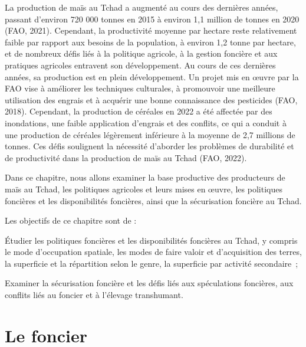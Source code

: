 \documentclass[12pt,oneside]{report}
\begin{document}
La production de maïs au Tchad a augmenté au cours des dernières années, passant d'environ 720 000 tonnes en 2015 à environ 1,1 million de tonnes en 2020 (FAO, 2021). Cependant, la productivité moyenne par hectare reste relativement faible par rapport aux besoins de la population, à environ 1,2 tonne par hectare, et de nombreux défis liés à la politique agricole, à la gestion foncière et aux pratiques agricoles entravent son développement. Au cours de ces dernières années, sa production est en plein développement. Un projet mis en œuvre par la FAO vise à améliorer les techniques culturales, à promouvoir une meilleure utilisation des engrais et à acquérir une bonne connaissance des pesticides ​(FAO, 2018)​. Cependant, la production de céréales en 2022 a été affectée par des inondations, une faible application d'engrais et des conflits, ce qui a conduit à une production de céréales légèrement inférieure à la moyenne de 2,7 millions de tonnes. Ces défis soulignent la nécessité d'aborder les problèmes de durabilité et de productivité dans la production de maïs au Tchad​ (FAO, 2022)​.

Dans ce chapitre, nous allons examiner la base productive des producteurs de maïs au Tchad, les politiques agricoles et leurs mises en œuvre, les politiques foncières et les disponibilités foncières, ainsi que la sécurisation foncière au Tchad.

Les objectifs de ce chapitre sont de :

Étudier les politiques foncières et les disponibilités foncières au Tchad, y compris le mode d’occupation spatiale, les modes de faire valoir et d’acquisition des terres, la superficie et la répartition selon le genre, la superficie par activité secondaire ;

Examiner la sécurisation foncière et les défis liés aux spéculations foncières, aux conflits liés au foncier et à l’élevage transhumant.

\section{Le foncier}
\end{document}
